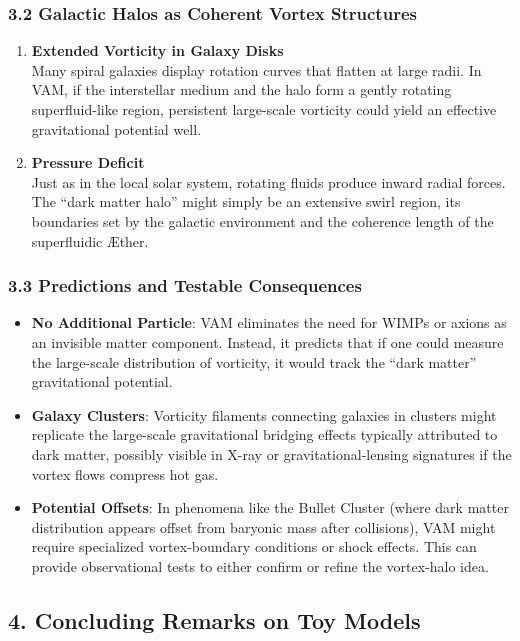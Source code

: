 \documentclass[aps,preprint,superscriptaddress]{revtex4-2}
\begin{document}
    \subsubsection*{3.2 Galactic Halos as Coherent Vortex Structures}
    \begin{enumerate}
        \item \textbf{Extended Vorticity in Galaxy Disks} \\
    Many spiral galaxies display rotation curves that flatten at large radii. In VAM, if the interstellar medium and the halo form a gently rotating superfluid-like region, persistent large-scale vorticity could yield an effective gravitational potential well.
        \item \textbf{Pressure Deficit} \\
    Just as in the local solar system, rotating fluids produce inward radial forces. The “dark matter halo” might simply be an extensive swirl region, its boundaries set by the galactic environment and the coherence length of the superfluidic Æther.
    \end{enumerate}

    \subsubsection*{3.3 Predictions and Testable Consequences}
    \begin{itemize}
        \item \textbf{No Additional Particle}: VAM eliminates the need for WIMPs or axions as an invisible matter component. Instead, it predicts that if one could measure the large-scale distribution of vorticity, it would track the “dark matter” gravitational potential.
        \item \textbf{Galaxy Clusters}: Vorticity filaments connecting galaxies in clusters might replicate the large-scale gravitational bridging effects typically attributed to dark matter, possibly visible in X-ray or gravitational-lensing signatures if the vortex flows compress hot gas.
        \item \textbf{Potential Offsets}: In phenomena like the Bullet Cluster (where dark matter distribution appears offset from baryonic mass after collisions), VAM might require specialized vortex-boundary conditions or shock effects. This can provide observational tests to either confirm or refine the vortex-halo idea.
    \end{itemize}

    \subsection*{4. Concluding Remarks on Toy Models}
\end{document}
